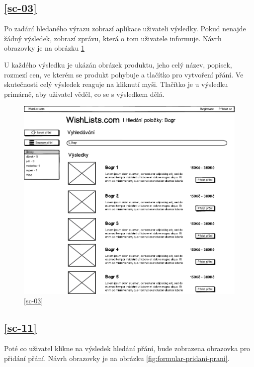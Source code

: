 \subsection{\ref{sc-03}}
Po zadání hledaného výrazu zobrazí aplikace uživateli výsledky. Pokud nenajde žádný výsledek, zobrazí zprávu, která o tom uživatele informuje. Návrh obrazovky je na obrázku \ref{fig:vysledky-hledani}

U každého výsledku je ukázán obrázek produktu, jeho celý název, popisek, rozmezí cen, ve kterém se produkt pohybuje a tlačítko pro vytvoření přání. Ve skutečnosti celý výsledek reaguje na kliknutí myši. Tlačítko je u výsledku primárně, aby uživatel věděl, co se s výsledkem dělá.

\begin{figure}[htb]
\begin{center}
\includegraphics[width=130mm]{./pictures/mock/vysledky-hledani.png}
\caption{\ref{sc-03}}
\label{fig:vysledky-hledani}
\end{center}
\end{figure}

\subsection{\ref{sc-11}}
\label{sec:wireframe-pridani-prani}
Poté co uživatel klikne na výsledek hledání přání, bude zobrazena obrazovka pro přidání přání.  Návrh obrazovky je na obrázku \ref{fig:formular-pridani-prani}.

